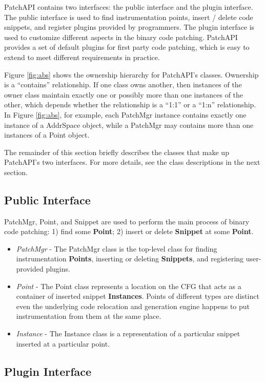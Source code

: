 \documentclass[11pt]{article}
\begin{document}
PatchAPI contains two interfaces: the public interface and the plugin interface.
The public interface is used to find instrumentation points, insert / delete
code snippets, and register plugins provided by programmers. The plugin
interface is used to customize different aspects in the binary code patching.
PatchAPI provides a set of default plugins for first party code patching, which
is easy to extend to meet different requirements in practice.

Figure \ref{fig:abs} shows the ownership hierarchy for PatchAPI's classes.
Ownership is a ``contains'' relationship. If one class owns another, then
instances of the owner class maintain exactly one or possibly more than one
instances of the other, which depends whether the relationship is a ``1:1'' or a
``1:n'' relationship. In Figure \ref{fig:abs}, for example, each PatchMgr instance
contains exactly one instance of a AddrSpace object, while a PatchMgr may
contains more than one instances of a Point object.

The remainder of this section briefly describes the classes that make up
PatchAPI's two interfaces. For more details, see the class descriptions in the
next section.
\subsection{Public Interface}
\label{sec-2.1}

PatchMgr, Point, and Snippet are used to perform the main process of binary code
patching: 1) find some \textbf{Point}; 2) insert or delete \textbf{Snippet} at some \textbf{Point}.
\begin{itemize}
\item \emph{PatchMgr} - The PatchMgr class is the top-level class for finding
    instrumentation \textbf{Points}, inserting or deleting \textbf{Snippets}, and registering
    user-provided plugins.
\item \emph{Point} - The Point class represents a location on the CFG that acts as a
    container of inserted snippet \textbf{Instances}. Points of different types are
    distinct even the underlying code relocation and generation engine happens
    to put instrumentation from them at the same place.
\item \emph{Instance} - The Instance class is a representation of a particular snippet
    inserted at a particular point.
\end{itemize}
\subsection{Plugin Interface}
\label{sec-2.2}
\end{document}
